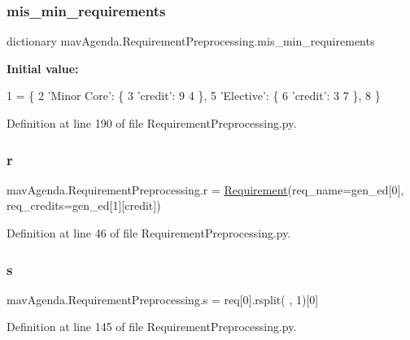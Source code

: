 \subsubsection{\texorpdfstring{mis\+\_\+min\+\_\+requirements}{mis\_min\_requirements}}
{\footnotesize\ttfamily dictionary mav\+Agenda.\+Requirement\+Preprocessing.\+mis\+\_\+min\+\_\+requirements}

{\bfseries Initial value\+:}
\begin{DoxyCode}
1 =  \{
2     \textcolor{stringliteral}{'Minor Core'}: \{
3         \textcolor{stringliteral}{'credit'}: 9
4     \},
5     \textcolor{stringliteral}{'Elective'}: \{
6         \textcolor{stringliteral}{'credit'}: 3
7     \},
8 \}
\end{DoxyCode}


Definition at line 190 of file Requirement\+Preprocessing.\+py.

\mbox{\label{namespacemavAgenda_1_1RequirementPreprocessing_afd34b3418f5b1e45bb01e7abfe14429f}} 
\subsubsection{\texorpdfstring{r}{r}}
{\footnotesize\ttfamily mav\+Agenda.\+Requirement\+Preprocessing.\+r = \mbox{\hyperlink{classmavAgenda_1_1landing_1_1models_1_1Requirement}{Requirement}}(req\+\_\+name=gen\+\_\+ed\mbox{[}0\mbox{]}, req\+\_\+credits=gen\+\_\+ed\mbox{[}1\mbox{]}\mbox{[}\textquotesingle{}credit\textquotesingle{}\mbox{]})}



Definition at line 46 of file Requirement\+Preprocessing.\+py.

\mbox{\label{namespacemavAgenda_1_1RequirementPreprocessing_a8a823232792345a3486a1ce30c051626}} 
\subsubsection{\texorpdfstring{s}{s}}
{\footnotesize\ttfamily mav\+Agenda.\+Requirement\+Preprocessing.\+s = req\mbox{[}0\mbox{]}.rsplit(\textquotesingle{} \textquotesingle{}, 1)\mbox{[}0\mbox{]}}



Definition at line 145 of file Requirement\+Preprocessing.\+py.

